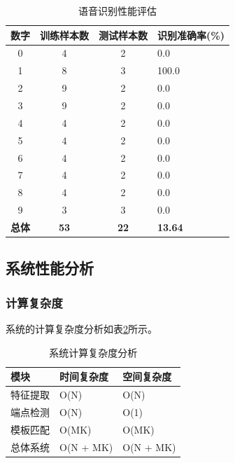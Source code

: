 \documentclass[sigconf,nonacm]{acmart}
\begin{document}
\begin{table}[htbp]
\caption{语音识别性能评估}
\label{tab:recognition_performance}
\begin{center}
\begin{tabular}{|c|c|c|p{1.3cm}|}
\hline
\textbf{数字} & \textbf{训练样本数} & \textbf{测试样本数} & \textbf{识别准确率(\%)} \\
\hline
0 & 4 & 2 & 0.0 \\
\hline
1 & 8 & 3 & 100.0 \\
\hline
2 & 9 & 2 & 0.0 \\
\hline
3 & 9 & 2 & 0.0 \\
\hline
4 & 4 & 2 & 0.0 \\
\hline
5 & 4 & 2 & 0.0 \\
\hline
6 & 4 & 2 & 0.0 \\
\hline
7 & 4 & 2 & 0.0 \\
\hline
8 & 4 & 2 & 0.0 \\
\hline
9 & 3 & 3 & 0.0 \\
\hline
\textbf{总体} & \textbf{53} & \textbf{22} & \textbf{13.64} \\
\hline
\end{tabular}
\end{center}
\end{table}

\subsection{系统性能分析}

\subsubsection{计算复杂度}

系统的计算复杂度分析如表\ref{tab:complexity}所示。

\begin{table}[htbp]
\caption{系统计算复杂度分析}
\label{tab:complexity}
\begin{center}
\begin{tabular}{|p{1.6cm}|p{1.8cm}|p{1.8cm}|}
\hline
\textbf{模块} & \textbf{时间复杂度} & \textbf{空间复杂度} \\
\hline
特征提取 & O(N) & O(N) \\
\hline
端点检测 & O(N) & O(1) \\
\hline
模板匹配 & O(MK) & O(MK) \\
\hline
总体系统 & O(N + MK) & O(N + MK) \\
\hline
\end{tabular}
\end{center}
\end{table}
\end{document}
